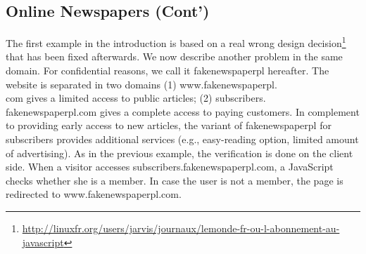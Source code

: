 \documentclass{sig-alternate}
\newcommand\fakenewspaper[0]{fakenewspaperpl\xspace}
\newcommand{\ie}{\emph{i.e.,}\xspace}
\newcommand{\dcs}[0]{\emph{Description of the case study.}\xspace}
\renewcommand{\dcs}[0]{}
\begin{document}


\subsection{Online Newspapers (Cont')}
\label{sec:casestudy1}


\dcs
 The first example in the introduction is based on a real wrong design decision\footnote{\url{http://linuxfr.org/users/jarvis/journaux/lemonde-fr-ou-l-abonnement-au-javascript}} that has been fixed afterwards. %
We now describe another problem in the same domain. For confidential reasons, we call it \textsf{\fakenewspaper} hereafter. %
% 
 The website is separated in two domains (1) 
www.\fakenewspaper.\\com gives a limited access to public articles;
 (2) subscribers.\\ \fakenewspaper.com gives a complete access to paying customers.
In complement to providing early access to new articles, the variant of \textsf{\fakenewspaper} for subscribers provides additional services (e.g., easy-reading option, limited amount of advertising). %
 As in the previous example, the verification is done on the client side. 
When a visitor accesses subscribers.\fakenewspaper.com, a JavaScript checks whether she is a member. 
In case the user is not a member, the page is redirected to www.\fakenewspaper.com. 
\end{document}

